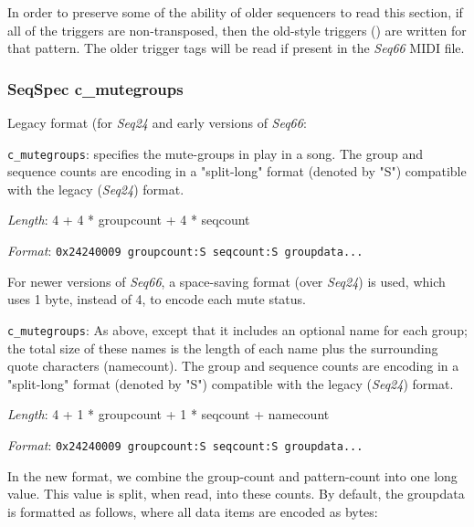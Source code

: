    In order to preserve some of the ability of older sequencers to read this
   section, if all of the triggers are non-transposed, then the old-style
   triggers () are written for that pattern.
   The older trigger tags will be read if
   present in the \textsl{Seq66} MIDI file.

\subsubsection{SeqSpec c\_mutegroups}
\label{subsubsec:midi_format_track_seqspec_mutegroups}

   Legacy format (for \textsl{Seq24} and early versions of \textsl{Seq66}:

   \begin{description}
      \item \texttt{c\_mutegroups}: specifies the mute-groups in play in a song.
         The group and sequence counts are encoding in
         a "split-long" format (denoted by "S") compatible with the legacy
         (\textsl{Seq24}) format.
      \item \textsl{Length}: 4 + 4 * groupcount + 4 * seqcount
      \item \textsl{Format}: \texttt{0x24240009 groupcount:S seqcount:S groupdata...}
   \end{description}

   For newer versions of \textsl{Seq66},
   a space-saving format (over \textsl{Seq24}) is used, which uses 1 byte,
   instead of 4, to encode each mute status.

   \begin{description}
      \item \texttt{c\_mutegroups}: As above, except that it
         includes an optional name for each group; the total size of these
         names is the length of each name plus the surrounding quote
         characters (namecount).  The group and sequence counts are encoding in
         a "split-long" format (denoted by "S") compatible with the legacy
         (\textsl{Seq24}) format.
      \item \textsl{Length}: 4 + 1 * groupcount + 1 * seqcount + namecount
      \item \textsl{Format}: \texttt{0x24240009 groupcount:S seqcount:S groupdata...}
   \end{description}

   In the new format, we combine the group-count and pattern-count into
   one long value. This value is split, when read, into these counts.
   By default, the groupdata is formatted as follows, where all data items are
   encoded as bytes:

